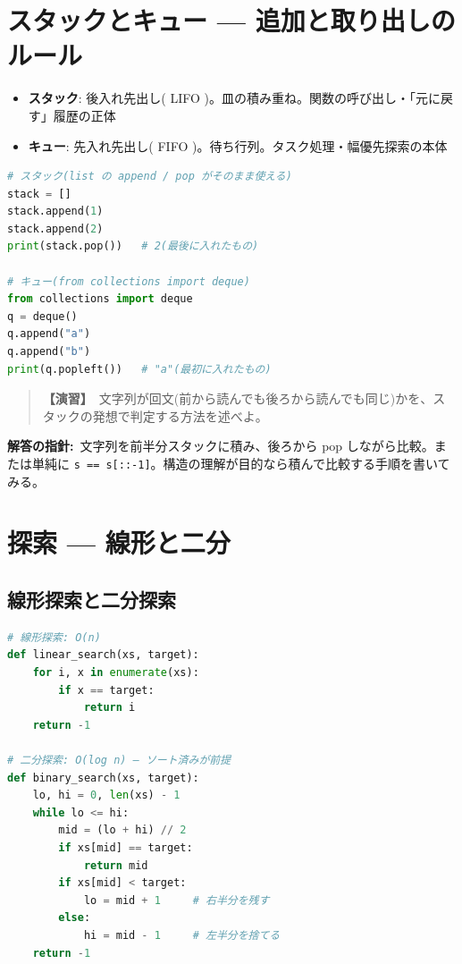 \documentclass{article}
\begin{document}
\section{スタックとキュー — 追加と取り出しのルール}

\begin{itemize}
\item \textbf{スタック}: 後入れ先出し( LIFO )。皿の積み重ね。関数の呼び出し・「元に戻す」履歴の正体
\item \textbf{キュー}: 先入れ先出し( FIFO )。待ち行列。タスク処理・幅優先探索の本体
\end{itemize}

\begin{lstlisting}[language=Python]
# スタック(list の append / pop がそのまま使える)
stack = []
stack.append(1)
stack.append(2)
print(stack.pop())   # 2(最後に入れたもの)

# キュー(from collections import deque)
from collections import deque
q = deque()
q.append("a")
q.append("b")
print(q.popleft())   # "a"(最初に入れたもの)
\end{lstlisting}

\begin{quote}
\textbf{【演習】}\ 文字列が回文(前から読んでも後ろから読んでも同じ)かを、スタックの発想で判定する方法を述べよ。
\end{quote}

\textbf{解答の指針:}\ 文字列を前半分スタックに積み、後ろから pop しながら比較。または単純に \texttt{s == s[::-1]}。構造の理解が目的なら積んで比較する手順を書いてみる。

\section{探索 — 線形と二分}

\subsection{線形探索と二分探索}

\begin{lstlisting}[language=Python]
# 線形探索: O(n)
def linear_search(xs, target):
    for i, x in enumerate(xs):
        if x == target:
            return i
    return -1

# 二分探索: O(log n) — ソート済みが前提
def binary_search(xs, target):
    lo, hi = 0, len(xs) - 1
    while lo <= hi:
        mid = (lo + hi) // 2
        if xs[mid] == target:
            return mid
        if xs[mid] < target:
            lo = mid + 1     # 右半分を残す
        else:
            hi = mid - 1     # 左半分を捨てる
    return -1
\end{lstlisting}
\end{document}
